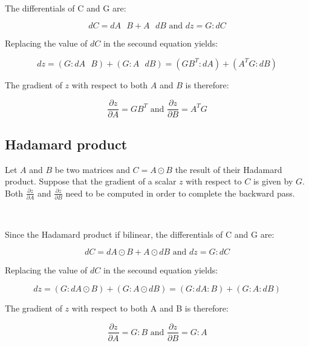 \

The differentials of C and G are:

\begin{equation}
  dC = dA \text{ } B + A \text{ } dB \text{ and } dz = G : dC 
\end{equation}

Replacing the value of $dC$ in the secound equation yields:

\begin{equation}
  dz = (G : dA \text{ } B) + (G : A \text{ } dB) = (GB^T : dA) + (A^TG : dB)
\end{equation}

The gradient of $z$ with respect to both $A$ and $B$ is therefore:

\begin{equation}
  \frac{\partial z}{\partial A} = GB^T \text{ and } \frac{\partial z}{\partial B} = A^T G
\end{equation}

\subsection{Hadamard product}

Let $A$ and $B$ be two matrices and $C = A \odot B$ the result of their
Hadamard product. Suppose that the gradient of a scalar $z$ with respect to $C$
is given by $G$. Both $\frac{\partial z}{\partial A}$ and $\frac{\partial
z}{\partial B}$ need to be computed in order to complete the backward pass.

\

Since the Hadamard product if bilinear, the differentials of C and G are:

\begin{equation}
  dC = dA \odot B + A \odot dB \text{ and } dz = G : dC 
\end{equation}

Replacing the value of $dC$ in the secound equation yields:

\begin{equation}
  dz = (G : dA \odot B) + (G : A \odot dB) = (G : dA : B) + (G : A : dB)
\end{equation}

The gradient of $z$ with respect to both A and B is therefore:

\begin{equation}
  \frac{\partial z}{\partial A} = G : B \text{ and } \frac{\partial z}{\partial B} = G : A
\end{equation}


